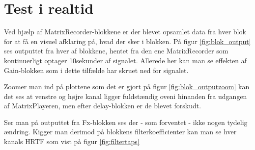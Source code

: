 \section{Test i realtid}

Ved hjælp af MatrixRecorder-blokkene er der blevet opsamlet data fra hver blok for at få en visuel afklaring på, hvad der sker i blokken. På figur \ref{fig:blok_output} ses outputtet fra hver af blokkene, hentet fra den ene MatrixRecorder som kontinuerligt optager 10sekunder af signalet. Allerede her kan man se effekten af Gain-blokken som i dette tilfælde har skruet ned for signalet.


Zoomer man ind på plottene som det er gjort på figur \ref{fig:blok_outputzoom} kan det ses at venstre og højre kanal ligger fuldstændig oveni hinanden fra udgangen af MatrixPlayeren, men efter delay-blokken er de blevet forskudt. 


Ser man på outputtet fra Fx-blokken ses der - som forventet - ikke nogen tydelig ændring. Kigger man derimod på blokkens filterkoefficienter kan man se hver kanals HRTF som vist på figur \ref{fig:filtertaps}

